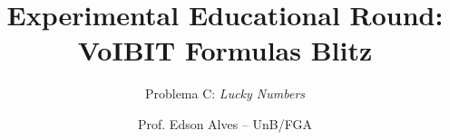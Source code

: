 \title{Experimental Educational Round: VoIBIT Formulas Blitz}
\subtitle{Problema C: \it Lucky Numbers}
\author{Prof. Edson Alves -- UnB/FGA}
\date{}

